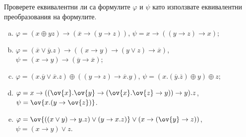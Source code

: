 \begin{problem}
  Проверете еквивалентни ли са формулите $\varphi$ и $\psi$ като използвате еквивалентни преобразования на формулите.
  \begin{enumerate}[a)]
  \item
    $\varphi = (x\oplus yz)\rightarrow (\overline{x}\rightarrow (y\rightarrow z))$,
    $\psi = x\rightarrow ((y\rightarrow z)\rightarrow x)$;
  \item
    $\varphi = (\overline{x}\vee \overline{y}.z)\rightarrow ((x\rightarrow y)\rightarrow (y\vee z)\rightarrow\overline{x})$,
    $\psi = (x\rightarrow y)\rightarrow(\overline{y}\rightarrow\overline{x})$;
  \item
    $\varphi = (x.\overline{y}\vee \overline{x}.z)\oplus ((y\rightarrow z)\rightarrow \overline{x}.y)$,
    $\psi = (x.(\overline{y}.\overline{z})\oplus y)\oplus z$;
  \item
    $\varphi = x\rightarrow ((\ov{x}.\ov{y}\rightarrow(\ov{x}.\ov{z}\rightarrow y))\rightarrow y).z$,
    $\psi = \ov{x.(y\rightarrow\ov{z})}$.
  \item
    $\varphi = \ov{((x\vee y) \rightarrow y.z)\vee (y\rightarrow x.z)} \vee (x\rightarrow (\ov{y}\rightarrow z))$,
    $\psi = (x\rightarrow y)\vee z$.
  \end{enumerate}
\end{problem}
